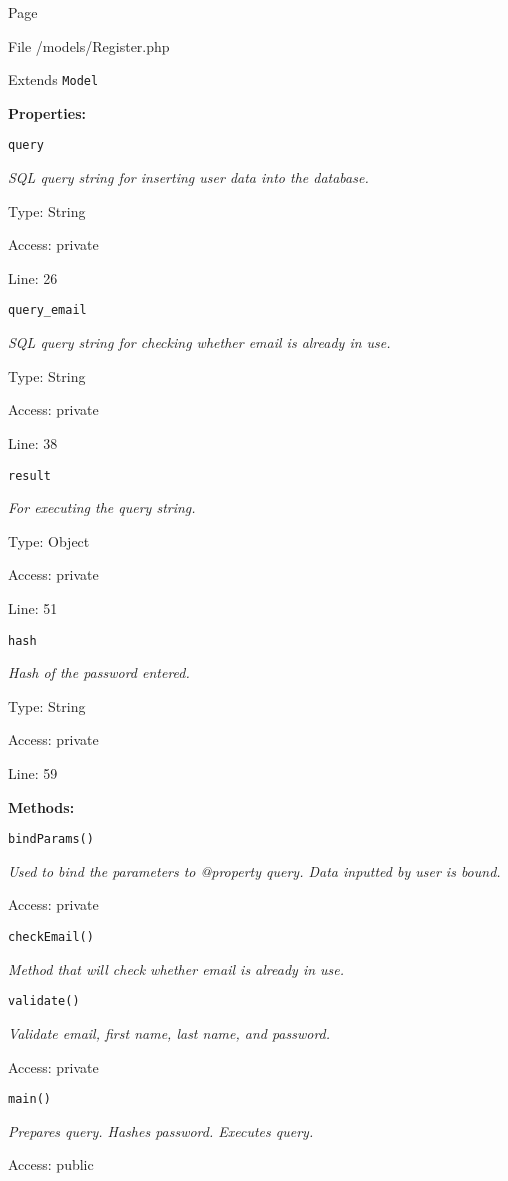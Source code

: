 Page \pageref{Register.php}

File /models/Register.php

Extends \texttt{Model}

\textbf{Properties:}

\texttt{query}

{\scriptsize
\textit{SQL query string for inserting user data into the database.}

Type: String

Access: private

Line: 26

}
\texttt{query\_email}

{\scriptsize
\textit{SQL query string for checking whether email is already in use.}

Type: String

Access: private

Line: 38

}
\texttt{result}

{\scriptsize
\textit{For executing the query string.}

Type: Object

Access: private

Line: 51

}
\texttt{hash}

{\scriptsize
\textit{Hash of the password entered.}

Type: String

Access: private

Line: 59

}
\textbf{Methods:}

\texttt{bindParams()}

{\scriptsize
\textit{Used to bind the parameters to @property query.
Data inputted by user is bound.}

Access: private

}

\texttt{checkEmail()}

{\scriptsize
\textit{Method that will check whether email is already in use.}

}

\texttt{validate()}

{\scriptsize
\textit{Validate email, first name, last name, and password.}

Access: private

}

\texttt{main()}

{\scriptsize
\textit{Prepares query.
Hashes password.
Executes query.}

Access: public

}

